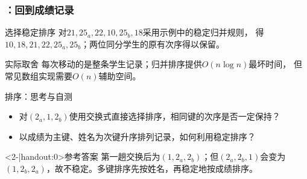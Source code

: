 \begin{frame}
    \frametitle{\insertsectionhead：回到成绩记录}
    \begin{exampleblock}{选择稳定排序}
        对$21,25_a,22,10,25_b,18$采用示例中的稳定归并规则，
        得$10,18,21,22,25_a,25_b$；两位同分学生的原有次序得以保留。
    \end{exampleblock}
    \begin{block}{实际取舍}
        每次移动的是整条学生记录；归并排序提供$O(n\log n)$最坏时间，
        但常见数组实现需要$O(n)$辅助空间。
    \end{block}
\end{frame}

\begin{frame}{排序：思考与自测}
    \begin{itemize}
        \item 对$(2_a,1,2_b)$使用交换式直接选择排序，相同键的次序是否一定保持？
        \item 以成绩为主键、姓名为次键升序排列记录，如何利用稳定排序？
    \end{itemize}
    \pause
    \begin{block}<2-|handout:0>{参考答案}
        第一趟交换后为$(1,2_a,2_b)$；但$(2_a,2_b,1)$会变为
        $(1,2_b,2_a)$，故不稳定。多键排序先按姓名，再稳定地按成绩排序。
    \end{block}
\end{frame}
